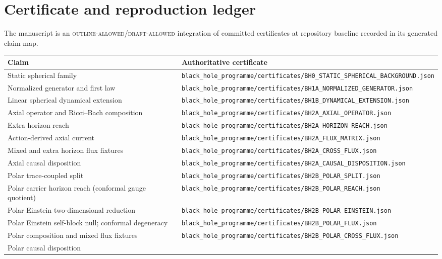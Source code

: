 \documentclass[11pt]{article}
\theoremstyle{definition}
\theoremstyle{remark}
\newcommand{\cert}[1]{\nolinkurl{#1}}
\begin{document}
\section{Certificate and reproduction ledger}

The manuscript is an \textsc{outline-allowed}/\textsc{draft-allowed}
integration of committed certificates at repository baseline recorded in
its generated claim map.

{\footnotesize
\begin{longtable}{@{}p{}p{}@{}}
\toprule
Claim & Authoritative certificate\\
\midrule
Static spherical family &
\cert{black_hole_programme/certificates/BH0_STATIC_SPHERICAL_BACKGROUND.json}\\
Normalized generator and first law &
\cert{black_hole_programme/certificates/BH1A_NORMALIZED_GENERATOR.json}\\
Linear spherical dynamical extension &
\cert{black_hole_programme/certificates/BH1B_DYNAMICAL_EXTENSION.json}\\
Axial operator and Ricci--Bach composition &
\cert{black_hole_programme/certificates/BH2A_AXIAL_OPERATOR.json}\\
Extra horizon reach &
\cert{black_hole_programme/certificates/BH2A_HORIZON_REACH.json}\\
Action-derived axial current &
\cert{black_hole_programme/certificates/BH2A_FLUX_MATRIX.json}\\
Mixed and extra horizon flux fixtures &
\cert{black_hole_programme/certificates/BH2A_CROSS_FLUX.json}\\
Axial causal disposition &
\cert{black_hole_programme/certificates/BH2A_CAUSAL_DISPOSITION.json}\\
Polar trace-coupled split &
\cert{black_hole_programme/certificates/BH2B_POLAR_SPLIT.json}\\
Polar carrier horizon reach (conformal gauge quotient) &
\cert{black_hole_programme/certificates/BH2B_POLAR_REACH.json}\\
Polar Einstein two-dimensional reduction &
\cert{black_hole_programme/certificates/BH2B_POLAR_EINSTEIN.json}\\
Polar Einstein self-block null; conformal degeneracy &
\cert{black_hole_programme/certificates/BH2B_POLAR_FLUX.json}\\
Polar composition and mixed flux fixtures &
\cert{black_hole_programme/certificates/BH2B_POLAR_CROSS_FLUX.json}\\
Polar causal disposition &

\end{longtable}}
\end{document}

